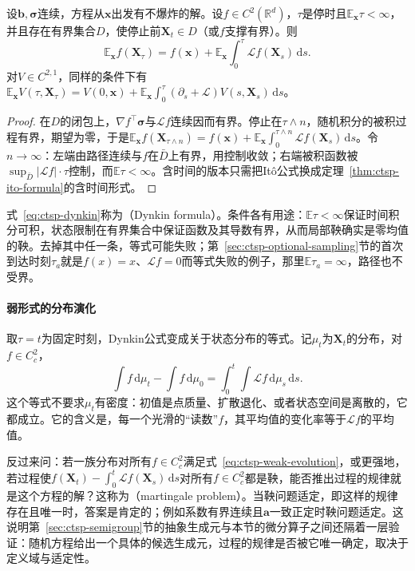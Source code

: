 \begin{theorem}[Dynkin公式]
  \label{thm:ctsp-dynkin}
  设$\bm b,\bm\sigma$连续，方程从$\bm x$出发有不爆炸的解。设$f\in C^2(\mathbb R^d)$，$\tau$是停时且$\mathbb E_{\bm x}\tau<\infty$，并且存在有界集合$D$，使停止前$\bm X_t\in D$（或$f$支撑有界）。则
  \begin{equation}
    \mathbb E_{\bm x}f(\bm X_\tau)=f(\bm x)+\mathbb E_{\bm x}\int_0^\tau\mathcal Lf(\bm X_s)\,\mathrm ds .
    \label{eq:ctsp-dynkin}
  \end{equation}
  对$V\in C^{2,1}$，同样的条件下有$\mathbb E_{\bm x}V(\tau,\bm X_\tau)=V(0,\bm x)+\mathbb E_{\bm x}\int_0^\tau(\partial_s+\mathcal L)V(s,\bm X_s)\,\mathrm ds$。
\end{theorem}

\begin{proof}
在$D$的闭包上，$\nabla f^\top\bm\sigma$与$\mathcal Lf$连续因而有界。停止在$\tau\wedge n$，随机积分的被积过程有界，期望为零，于是$\mathbb E_{\bm x}f(\bm X_{\tau\wedge n})=f(\bm x)+\mathbb E_{\bm x}\int_0^{\tau\wedge n}\mathcal Lf(\bm X_s)\,\mathrm ds$。令$n\to\infty$：左端由路径连续与$f$在$\bar D$上有界，用控制收敛；右端被积函数被$\sup_{\bar D}|\mathcal Lf|\cdot\tau$控制，而$\mathbb E\tau<\infty$。含时间的版本只需把Itô公式换成定理~\ref{thm:ctsp-ito-formula}的含时间形式。
\end{proof}

式~\eqref{eq:ctsp-dynkin}称为（Dynkin formula）。条件各有用途：$\mathbb E\tau<\infty$保证时间积分可积，状态限制在有界集合中保证函数及其导数有界，从而局部鞅确实是零均值的鞅。去掉其中任一条，等式可能失败；第~\ref{sec:ctsp-optional-sampling}节的首次到达时刻$\tau_a$就是$f(x)=x$、$\mathcal Lf=0$而等式失败的例子，那里$\mathbb E\tau_a=\infty$，路径也不受界。

\paragraph{弱形式的分布演化}
取$\tau=t$为固定时刻，Dynkin公式变成关于状态分布的等式。记$\mu_t$为$\bm X_t$的分布，对$f\in C^2_c$，
\begin{equation}
  \int f\,\mathrm d\mu_t-\int f\,\mathrm d\mu_0=\int_0^t\int\mathcal Lf\,\mathrm d\mu_s\,\mathrm ds .
  \label{eq:ctsp-weak-evolution}
\end{equation}
这个等式不要求$\mu_t$有密度：初值是点质量、扩散退化、或者状态空间是离散的，它都成立。它的含义是，每一个光滑的“读数”$f$，其平均值的变化率等于$\mathcal Lf$的平均值。

反过来问：若一族分布对所有$f\in C^2_c$满足式~\eqref{eq:ctsp-weak-evolution}，或更强地，若过程使$f(\bm X_t)-\int_0^t\mathcal Lf(\bm X_s)\,\mathrm ds$对所有$f\in C^2_c$都是鞅，能否推出过程的规律就是这个方程的解？这称为（martingale problem）。当鞅问题适定，即这样的规律存在且唯一时，答案是肯定的；例如系数有界连续且$\bm a$一致正定时鞅问题适定。这说明第~\ref{sec:ctsp-semigroup}节的抽象生成元与本节的微分算子之间还隔着一层验证：随机方程给出一个具体的候选生成元，过程的规律是否被它唯一确定，取决于定义域与适定性。

